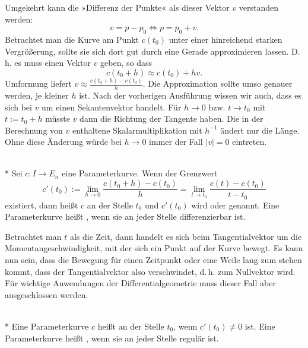 Umgekehrt kann die »Differenz der Punkte« als dieser Vektor $v$
verstanden werden:%
\begin{equation}
v = p-p_0 \iff p = p_0+v.
\end{equation}
Betrachtet man die Kurve am Punkt $c(t_0)$ unter einer hinreichend
starken Vergrößerung, sollte sie sich dort gut durch
eine Gerade approximieren lassen. D.\,h. es muss einen Vektor $v$
geben, so dass
\begin{equation}
c(t_0+h) \approx c(t_0)+hv.
\end{equation}
Umformung liefert $v \approx \tfrac{c(t_0+h)-c(t_0)}{h}$.
Die Approximation sollte umso genauer werden, je kleiner $h$ ist.
Nach der vorherigen Ausführung wissen wir auch, dass es sich bei
$v$ um einen Sekantenvektor handelt. Für $h\to 0$ bzw.
$t\to t_0$ mit $t:=t_0+h$ müsste $v$ dann die Richtung der Tangente
haben. Die in der Berechnung von $v$ enthaltene Skalarmultiplikation
mit $h^{-1}$ ändert nur die Länge. Ohne diese Änderung würde bei $h\to 0$
immer der Fall $|v|=0$ eintreten.
\begin{definition}%
\label{diff-Parameterkurve}\mbox{}\\*
Sei $c\colon I\to E_n$ eine Parameterkurve. Wenn der Grenzwert
\begin{equation}
c'(t_0) := \lim_{h\to 0} \frac{c(t_0+h)-c(t_0)}{h}
= \lim_{t\to t_0} \frac{c(t)-c(t_0)}{t-t_0}
\end{equation}
existiert, dann heißt $c$ an der Stelle $t_0$
 und $c'(t_0)$ wird 
oder  genannt. Eine Parameterkurve heißt
, wenn sie an jeder Stelle differenzierbar ist.
\end{definition}
Betrachtet man $t$ als die Zeit, dann handelt es sich beim
Tangentialvektor um die Momentangeschwindigkeit, mit der sich ein
Punkt auf der Kurve bewegt. Es kann nun sein, dass die Bewegung für
einen Zeitpunkt oder eine Weile lang zum stehen kommt, dass der
Tangentialvektor also verschwindet, d.\,h. zum Nullvektor wird.
Für wichtige Anwendungen der Differentialgeometrie muss dieser
Fall aber ausgeschlossen werden.
\begin{definition}%
\mbox{}\\*
Eine Parameterkurve $c$ heißt  an der Stelle $t_0$,
wenn $c'(t_0)\ne 0$ ist. Eine Parameterkurve heißt ,
wenn sie an jeder Stelle regulär ist.
\end{definition}

